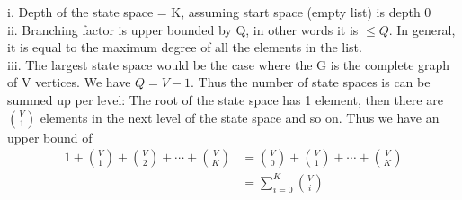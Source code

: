 \documentclass{article}
\begin{document}
i. Depth of the state space = K, assuming start space (empty list) is depth 0\\
ii. Branching factor is upper bounded by Q, in other words it is $\leq Q$. In general, it is equal to the maximum degree of all the elements in the list.\\
iii. The largest state space would be the case where the G is the complete graph of V vertices. We have $Q=V-1$. Thus the number of state spaces is can be summed up per level: The root of the state space has 1 element, then there are $V\choose 1$ elements in the next level of the state space and so on. Thus we have an upper bound of 
\begin{align*}
	1+{V\choose 1}+{V\choose 2}+\cdots + {V\choose K}&={V\choose 0}+{V\choose 1}+\cdots +{V\choose K}\\
	&=\sum_{i=0}^{K}{V\choose i}
\end{align*}
\end{document}
